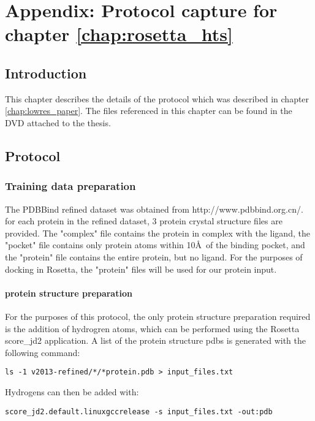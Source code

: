 \chapter{Appendix:  Protocol capture for chapter \ref{chap:rosetta_hts}}
\label{chap:hts_appendix}
\section{Introduction}

This chapter describes the details of the protocol which was described in chapter \ref{chap:lowres_paper}.
The files referenced in this chapter can be found in the DVD attached to the thesis.

\section{Protocol}

\subsection{Training data preparation}
\label{subsec:training_data_prep}
The PDBBind refined dataset was obtained from http://www.pdbbind.org.cn/.
for each protein in the refined dataset, 3 protein crystal structure files are provided.
The "complex" file contains the protein in complex with the ligand, the "pocket" file contains only protein atoms within 10\AA\ of the binding pocket, and the "protein" file contains the entire protein, but no ligand.
For the purposes of docking in Rosetta, the "protein" files will be used for our protein input.

\subsubsection{protein structure preparation}

For the purposes of this protocol, the only protein structure preparation required is the addition of hydrogren atoms, which can be performed using the Rosetta score\_jd2 application.
A list of the protein structure pdbs is generated with the following command:
\singlespace
\begin{Verbatim}
ls -1 v2013-refined/*/*protein.pdb > input_files.txt
\end{Verbatim}
\doublespace
Hydrogens can then be added with:
\singlespace
\begin{Verbatim}
score_jd2.default.linuxgccrelease -s input_files.txt -out:pdb
\end{Verbatim}
\doublespace

